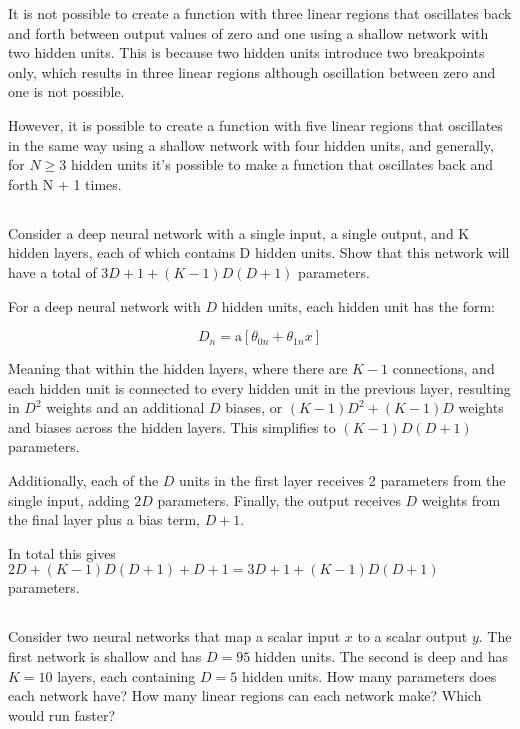 \documentclass[12pt]{report}
\begin{document}
It is not possible to create a function with three linear regions that oscillates back and forth between output values of zero and one using a shallow network with two hidden units. This is because two hidden units introduce two breakpoints only, which results in three linear regions although oscillation between zero and one is not possible.

However, it is possible to create a function with five linear regions that oscillates in the same way using a shallow network with four hidden units, and generally, for $N \geq 3$ hidden units it’s possible to make a function that oscillates back and forth N + 1 times.

\subsection{}
\begin{mdframed}
    Consider a deep neural network with a single input, a single output, and K hidden layers, each of which contains D hidden units. Show that this network will have a total of $3D + 1 + (K-1)D(D+1)$ parameters.
\end{mdframed}

For a deep neural network with $D$ hidden units, each hidden unit has the form:

\begin{equation*}
    D_{n} = \text{a}[\theta_{0n} + \theta_{1n}x]
\end{equation*}

Meaning that within the hidden layers, where there are $K-1$ connections, and each hidden unit is connected to every hidden unit in the previous layer, resulting in $D^{2}$ weights and an additional $D$ biases, or $(K-1)D^{2} + (K-1)D$ weights and biases across the hidden layers. This simplifies to $(K-1)D(D+1)$ parameters.

Additionally, each of the $D$ units in the first layer receives 2 parameters from the single input, adding $2D$ parameters. Finally, the output receives $D$ weights from the final layer plus a bias term, $D+1$.

In total this gives $2D + (K-1)D(D+1) + D + 1 = 3D + 1 + (K-1)D(D+1)$ parameters.

\subsection{}
\begin{mdframed}
    Consider two neural networks that map a scalar input $x$ to a scalar output $y$. The first network is shallow and has $D = 95$ hidden units. The second is deep and has $K=10$ layers, each containing $D=5$ hidden units. How many parameters does each network have? How many linear regions can each network make? Which would run faster?
\end{mdframed}
\end{document}
